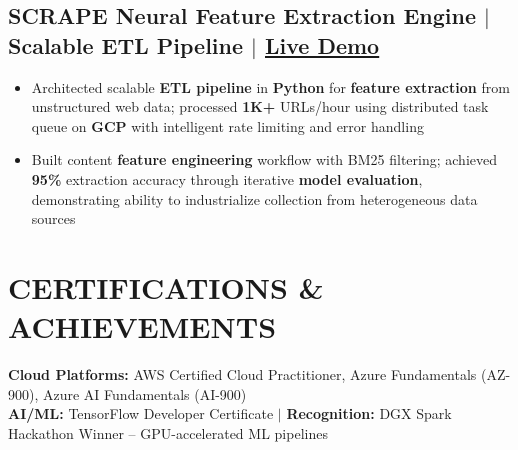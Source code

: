 \documentclass[10pt,letterpaper]{article}
\begin{document}
\subsection{SCRAPE Neural Feature Extraction Engine $|$ Scalable ETL Pipeline $|$ \href{https://automatic-winner-mocha.vercel.app}{Live Demo}}
{\small
\begin{itemize}
    \item Architected scalable \textbf{ETL pipeline} in \textbf{Python} for \textbf{feature extraction} from unstructured web data; processed \textbf{1K+} URLs/hour using distributed task queue on \textbf{GCP} with intelligent rate limiting and error handling
    \item Built content \textbf{feature engineering} workflow with BM25 filtering; achieved \textbf{95\%} extraction accuracy through iterative \textbf{model evaluation}, demonstrating ability to industrialize collection from heterogeneous data sources
\end{itemize}}

\section{CERTIFICATIONS \& ACHIEVEMENTS}
{\small
\textbf{Cloud Platforms:} AWS Certified Cloud Practitioner, Azure Fundamentals (AZ-900), Azure AI Fundamentals (AI-900) \\
\textbf{AI/ML:} TensorFlow Developer Certificate $|$ \textbf{Recognition:} DGX Spark Hackathon Winner -- GPU-accelerated ML pipelines}
\end{document}
